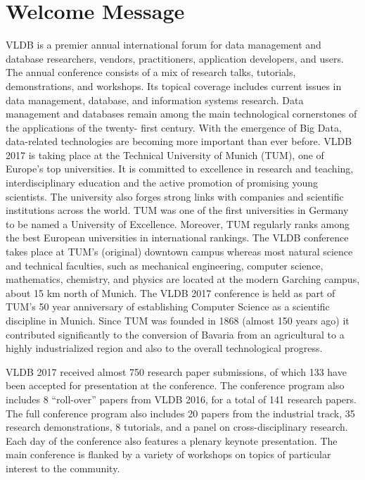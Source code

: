 \section*{Welcome Message}

VLDB is a premier annual international forum for data management
and database researchers, vendors, practitioners, application developers,
and users. The annual conference consists of a mix of research talks, tutorials,
demonstrations, and workshops. Its topical coverage includes current
issues in data management, database, and information systems research.
Data management and databases remain among the main technological
cornerstones of the applications of the twenty- first century.
With the emergence of Big Data, data-related technologies are becoming
more important than ever before.
VLDB 2017 is taking place at the Technical University of Munich (TUM),
one of Europe's top universities. It is committed to excellence in
research and teaching, interdisciplinary education and the active promotion
of promising young scientists. The university also forges strong links with
companies and scientific institutions across the world.
TUM was one of the first universities in Germany to be named a University of Excellence.
Moreover, TUM regularly ranks among the best European universities in international rankings.
The VLDB conference takes place at TUM's (original) downtown campus whereas most
natural science and technical faculties, such as mechanical engineering,
computer science, mathematics, chemistry, and physics are located at the modern
Garching campus, about 15 km north of Munich.
The VLDB 2017 conference is held as part of TUM's 50 year anniversary of
establishing Computer Science as a scientific discipline in Munich.
Since TUM was founded in 1868 (almost 150 years ago) it contributed significantly
to the conversion of Bavaria from an agricultural to a highly industrialized region
and also to the overall technological progress. 

VLDB 2017 received almost 750 research paper submissions, of which 133 have been accepted
for presentation at the conference.
The conference program also includes 8 ``roll-over'' papers from VLDB 2016, for a total of
141 research papers.
The full conference program also includes 20 papers from the industrial track, 35 research demonstrations,
8 tutorials, and a panel on cross-disciplinary research.
Each day of the conference also features a plenary keynote presentation.
The main conference is flanked by a variety of workshops on topics of particular interest to the community.

